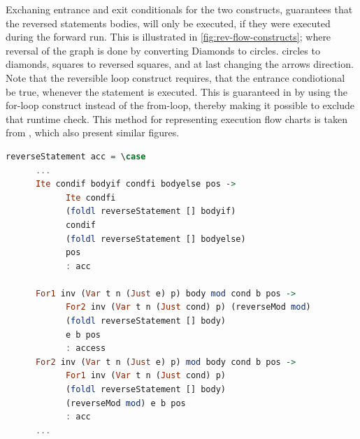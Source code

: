 Exchaning entrance and exit conditionals for the two constructs, guarantees that the reversed
statements bodies, will only be executed, if they were executed during the forward run. This
is illustrated in \autoref{fig:rev-flow-constructs}; where reversal of the graph is done
by converting Diamonds to circles. circles to diamonds, squares to reversed squares, and at
last changing the arrows direction. Note that the reversible loop construct requires, that
the entrance condiotional be true, whenever the statement is executed. This is guaranteed in
\lan by using the for-loop construct instead of the from-loop, thereby making it possible to
exclude that runtime check. This method for representing execution flow charts is taken from
\cite{pld}, which also present similar figures.

\begin{lstlisting}[language=Haskell, label={lst:stmt-reverser}, caption={Reversing for-loops and if-statements.}]
reverseStatement acc = \case
      ...
      Ite condif bodyif condfi bodyelse pos ->
            Ite condfi
            (foldl reverseStatement [] bodyif)
            condif
            (foldl reverseStatement [] bodyelse)
            pos
            : acc

      For1 inv (Var t n (Just e) p) body mod cond b pos ->
            For2 inv (Var t n (Just cond) p) (reverseMod mod)
            (foldl reverseStatement [] body)
            e b pos
            : access
      For2 inv (Var t n (Just e) p) mod body cond b pos ->
            For1 inv (Var t n (Just cond) p)
            (foldl reverseStatement [] body)
            (reverseMod mod) e b pos
            : acc
      ...
\end{lstlisting}


